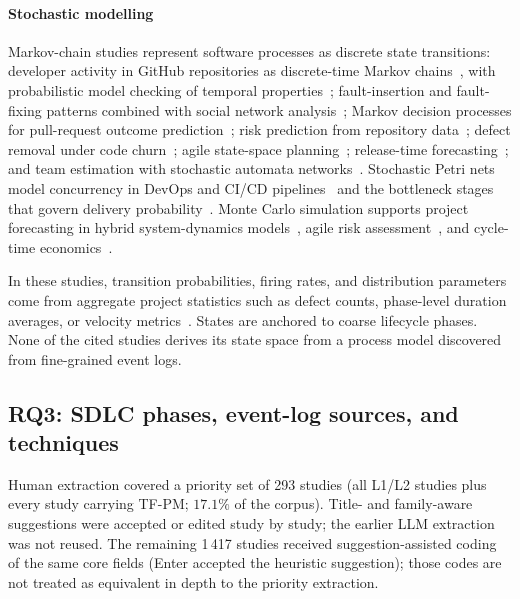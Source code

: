 \documentclass[preprint,12pt,authoryear=false]{elsarticle}
\newcommand{\PM}{TF-PM}
\begin{document}
\paragraph{Stochastic modelling}
Markov-chain studies represent software processes as discrete state transitions: developer activity in GitHub repositories as discrete-time Markov chains~\cite{jo2023}, with probabilistic model checking of temporal properties~\cite{jo2024}; fault-insertion and fault-fixing patterns combined with social network analysis~\cite{ortu2023}; Markov decision processes for pull-request outcome prediction~\cite{joshi2024}; risk prediction from repository data~\cite{jeon2015}; defect removal under code churn~\cite{tian2005}; agile state-space planning~\cite{tyagi2021}; release-time forecasting~\cite{washizaki2015}; and team estimation with stochastic automata networks~\cite{massitela2018}. Stochastic Petri nets model concurrency in DevOps and CI/CD pipelines~\cite{mesmia2021} and the bottleneck stages that govern delivery probability~\cite{bhadra2022,bhadra2023}. Monte Carlo simulation supports project forecasting in hybrid system-dynamics models~\cite{li2020}, agile risk assessment~\cite{lunesu2021}, and cycle-time economics~\cite{magennis2015}.

In these studies, transition probabilities, firing rates, and distribution parameters come from aggregate project statistics such as defect counts, phase-level duration averages, or velocity metrics~\cite{nafreen2020,bhadra2022,li2020}. States are anchored to coarse lifecycle phases. None of the cited studies derives its state space from a process model discovered from fine-grained event logs.

\subsection{RQ3: SDLC phases, event-log sources, and techniques}\label{sec:rq3}

Human extraction covered a priority set of 293 studies (all L1/L2 studies plus every study carrying \PM{}; $17.1\%$ of the corpus). Title- and family-aware suggestions were accepted or edited study by study; the earlier LLM extraction was not reused. The remaining 1\,417 studies received suggestion-assisted coding of the same core fields (Enter accepted the heuristic suggestion); those codes are not treated as equivalent in depth to the priority extraction.
\end{document}
